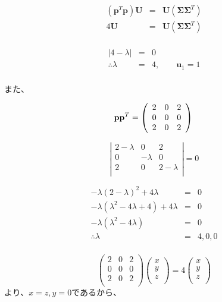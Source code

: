 \begin{enumerate}
\begin{enumerate}
\begin{eqnarray*}
({\mathbf p}^T {\mathbf p}) {\mathbf U}& = & {\mathbf U}( {\mathbf \Sigma}{\mathbf \Sigma}^T) \\
4{\mathbf U}& = & {\mathbf U}( {\mathbf \Sigma}{\mathbf \Sigma}^T) \\          
\end{eqnarray*}

\begin{eqnarray*}
| 4 - \lambda | & = & 0 \\
\therefore \lambda & = & 4, \hspace{2em}{\mathbf u}_1 = 1 \\
\end{eqnarray*}

また、

\[
{\mathbf p}{\mathbf p}^T =  
\left(
\begin{array}{rrr}
2 & 0 & 2 \\
0 & 0 & 0 \\
2 & 0 & 2 \\
\end{array}
\right) \\
\]

\[
\left|
\begin{array}{ccc}
2-\lambda & 0        & 2 \\
0         & -\lambda & 0 \\
2         & 0        & 2-\lambda \\
\end{array}
\right|
= 0
\]

\begin{eqnarray*}
- \lambda ( 2 - \lambda )^2 + 4 \lambda & = & 0 \\
- \lambda ( \lambda^2 - 4 \lambda + 4 ) + 4 \lambda & = & 0 \\ 
- \lambda ( \lambda^2 - 4 \lambda ) & = & 0 \\ 
\therefore \lambda & = & 4, 0, 0 \\
\end{eqnarray*}

\[
\left(
\begin{array}{ccc}
2 & 0 & 2 \\
0 & 0 & 0 \\
2 & 0 & 2 \\
\end{array}
\right)
\left(
\begin{array}{c}
x \\
y \\
z \\
\end{array}
\right)
= 
4
\left(
\begin{array}{c}
x \\
y \\
z \\
\end{array}
\right)
\]
より、\(x=z, y=0\)であるから、


\end{enumerate}
\end{enumerate}
